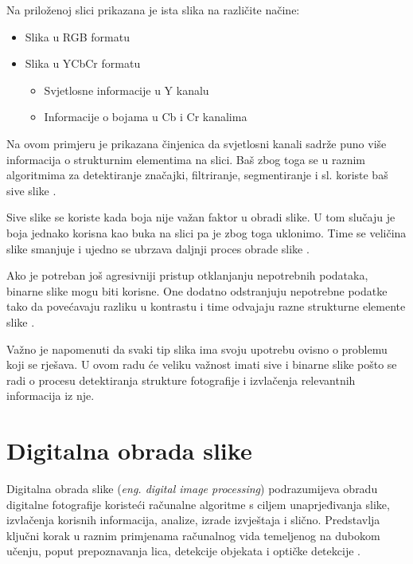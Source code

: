 \documentclass{foi}
\begin{document}
\begin{flushleft}
    Na priloženoj slici prikazana je ista slika na različite načine:
    \begin{itemize}[label=•]
        \item Slika u RGB formatu
        \item Slika u YCbCr formatu
        \begin{itemize}[label=•]
            \item Svjetlosne informacije u Y kanalu
            \item Informacije o bojama u Cb i Cr kanalima
        \end{itemize}
    \end{itemize}
    \end{flushleft}

Na ovom primjeru je prikazana činjenica da svjetlosni kanali sadrže puno više informacija o strukturnim elementima na slici. Baš zbog toga se u raznim algoritmima za detektiranje značajki, filtriranje, segmentiranje i sl. koriste baš sive slike \cite{LumVsChrom}. 

Sive slike se koriste kada boja nije važan faktor u obradi slike. U tom slučaju je boja jednako korisna kao buka na slici pa je zbog toga uklonimo. Time se veličina slike smanjuje i ujedno se ubrzava daljnji proces obrade slike \cite{LumVsChrom}.

Ako je potreban još agresivniji pristup otklanjanju nepotrebnih podataka, binarne slike mogu biti korisne. One dodatno odstranjuju nepotrebne podatke tako da povećavaju razliku u kontrastu i time odvajaju razne strukturne elemente slike \cite{LumVsChrom}.

Važno je napomenuti da svaki tip slika ima svoju upotrebu ovisno o problemu koji se rješava. U ovom radu će veliku važnost imati sive i binarne slike pošto se radi o procesu detektiranja strukture fotografije i izvlačenja relevantnih informacija iz nje.

\section{Digitalna obrada slike}

Digitalna obrada slike (\textit{eng. digital image processing}) podrazumijeva obradu digitalne fotografije koristeći računalne algoritme s ciljem unaprjeđivanja slike, izvlačenja korisnih informacija, analize, izrade izvještaja i slično. Predstavlja ključni korak u raznim primjenama računalnog vida temeljenog na dubokom učenju, poput prepoznavanja lica, detekcije objekata i optičke detekcije \cite{ImageProcessing}. 
\end{document}
